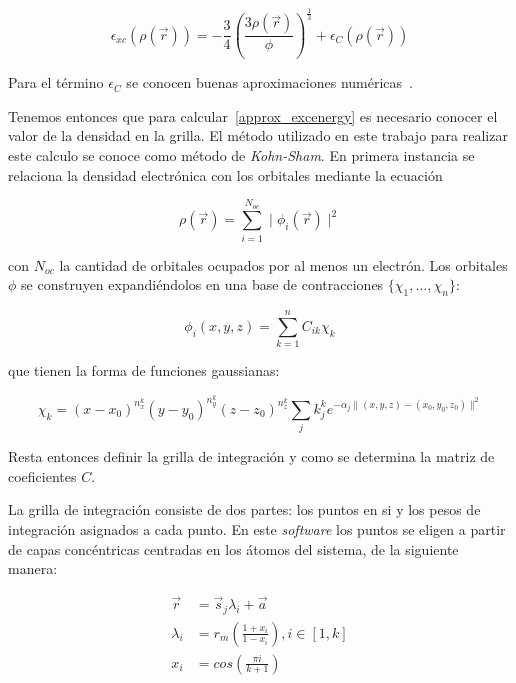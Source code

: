\begin{equation}
    \epsilon_{xc}(\rho(\vec{r})) = -\frac{3}{4} \left (\frac{3 \rho(\vec{r})}{\phi} \right )^{\frac{1}{3}} + \epsilon_{C}(\rho(\vec{r}))
\end{equation}

Para el t\'ermino $\epsilon_{C}$ se conocen buenas aproximaciones num\'ericas~\cite{Vosko}.

Tenemos entonces que para calcular~\ref{approx_excenergy} es necesario conocer el valor de la densidad en la grilla.
El m\'etodo utilizado en este trabajo para realizar este calculo se conoce como m\'etodo de \textit{Kohn-Sham}. En primera instancia
se relaciona la densidad electr\'onica con los orbitales mediante la ecuaci\'on

\begin{equation}
    \rho(\vec{r}) = \sum_{i = 1}^{N_{oc}} \mid \phi_i(\vec{r}) \mid ^2
\end{equation}

con $N_{oc}$ la cantidad de orbitales ocupados por al menos un electr\'on. Los orbitales $\phi$ se construyen expandi\'endolos en una
base de contracciones $\{ \chi_1, \dots, \chi_n \}$:

\begin{equation}
    \phi_i(x,y,z) = \sum_{k = 1}^n C_{ik} \chi_k
\end{equation}

que tienen la forma de funciones gaussianas:

\begin{equation}
    \chi_k = (x - x_0)^{n_x^k} (y - y_0)^{n_y^k} (z - z_0)^{n_z^k} \sum_j k_j^k e^{-\alpha_j \|(x,y,z) - (x_0,y_0,z_0) \|^2 }
\end{equation}

Resta entonces definir la grilla de integraci\'on y como se determina la matriz de coeficientes $C$. 

La grilla de integraci\'on consiste de dos partes: los puntos en si y los pesos de integraci\'on asignados a cada punto. En este
\textit{software} los puntos se eligen a partir de capas conc\'entricas centradas en los \'atomos del sistema, de la siguiente
manera:

\begin{align}
    \vec{r} & = \vec{s}_j \lambda_i + \vec{a} \\
    \lambda_i & = r_m \left ( \frac{1 + x_i}{1 - x_i} \right), i \in [1, k] \\
    x_i & = cos \left ( \frac{\pi i }{k + 1} \right )
\end{align}

